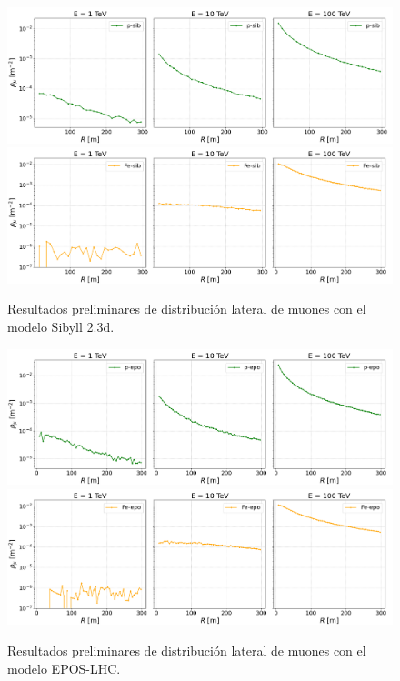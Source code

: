 \documentclass[10pt,xcolor=table]{beamer}
\begin{document}
\begin{frame}[noframenumbering]
\center
	\begin{figure}
	\includegraphics[height=0.4\textheight]{Figuras/lateraldist-psib}
	\includegraphics[height=0.4\textheight]{Figuras/lateraldist-Fesib}
	\caption{Resultados preliminares de distribuci\'on lateral de muones con el modelo Sibyll 2.3d.}
	\end{figure}
\end{frame}

\begin{frame}[noframenumbering]
\center
	\begin{figure}
	\includegraphics[height=0.4\textheight]{Figuras/lateraldist-pepo}
	\includegraphics[height=0.4\textheight]{Figuras/lateraldist-Feepo}
	\caption{Resultados preliminares de distribuci\'on lateral de muones con el modelo EPOS-LHC.}
	\end{figure}
\end{frame}
\end{document}
